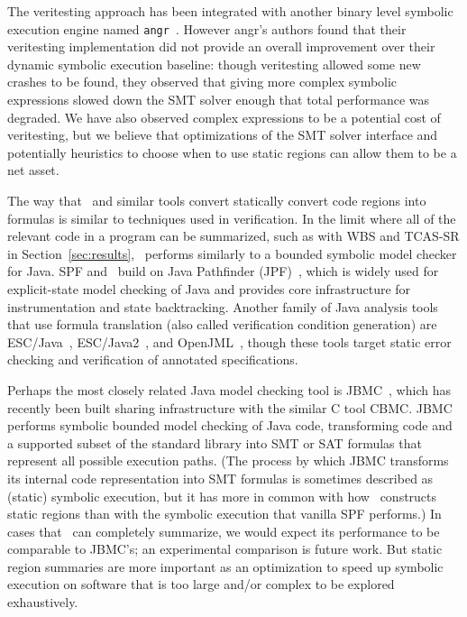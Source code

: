 The veritesting approach has been integrated with another binary level
symbolic execution engine named {\tt angr}~\cite{angr}.
%
However angr's authors found that their veritesting implementation did
not provide an overall improvement over their dynamic symbolic
execution baseline: though veritesting allowed some new crashes to be
found, they observed that giving more complex symbolic expressions
slowed down the SMT solver enough that total performance was degraded.
%
We have also observed complex expressions to be a potential cost of
veritesting, but we believe that optimizations of the SMT solver
interface and potentially heuristics to choose when to use static
regions can allow them to be a net asset.

The way that \tool\ and similar tools convert statically convert code
regions into formulas is similar to techniques used in verification.
%
In the limit where all of the relevant code in a program can be
summarized, such as with WBS and TCAS-SR in Section~\ref{sec:results},
\tool\ performs similarly to a bounded symbolic model checker for
Java.
%
SPF and \tool\ build on Java Pathfinder (JPF)~\cite{jpf}, which is
widely used for explicit-state model checking of Java and provides
core infrastructure for instrumentation and state backtracking.
%
Another family of Java analysis tools that use formula translation
(also called verification condition generation) are
ESC/Java~\cite{FlanaganLLNSS2002}, ESC/Java2~\cite{CokK2004}, and
OpenJML~\cite{Cok2011}, though these tools target static error
checking and verification of annotated specifications.

Perhaps the most closely related Java model checking tool is
JBMC~\cite{CordeiroKKST2018}, which has recently been built sharing
infrastructure with the similar C tool CBMC.
%
JBMC performs symbolic bounded model checking of Java code,
transforming code and a supported subset of the standard library into
SMT or SAT formulas that represent all possible execution paths.
%
(The process by which JBMC transforms its internal code representation
into SMT formulas is sometimes described as (static) symbolic
execution, but it has more in common with how \tool\ constructs static
regions than with the symbolic execution that vanilla SPF performs.)
%
In cases that \tool\ can completely summarize, we would expect its
performance to be comparable to JBMC's; an experimental comparison is
future work.
%
But static region summaries are more important as an optimization to
speed up symbolic execution on software that is too large and/or
complex to be explored exhaustively.

